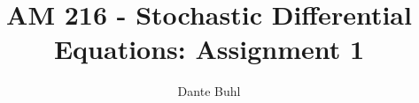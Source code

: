 \documentclass{article}
\begin{document}
\title{AM 216 - Stochastic Differential Equations: Assignment 1}
\author{Dante Buhl}


\newcommand{\wrms}{w_{\text{rms}}}
\newcommand{\bs}[1]{\boldsymbol{#1}}
\newcommand{\tb}[1]{\textbf{#1}}
\newcommand{\bmp}[1]{\begin{minipage}{#1\textwidth}}
\newcommand{\emp}{\end{minipage}}
\newcommand{\R}{\mathbb{R}}
\newcommand{\C}{\mathbb{C}}
\newcommand{\N}{\mathcal{N}}
\newcommand{\Var}{\text{Var}}
\newcommand{\Cov}{\text{Cov}}
\newcommand{\Bino}{\text{Bino}}
\newcommand{\Norm}{\mathcal{N}}
\newcommand{\erf}{\text{erf}}
\newcommand{\m}{\bs{\mu}_*}
\newcommand{\s}{\bs{\Sigma}_*}
\newcommand{\dt}{\Delta t}
\newcommand{\dx}{\Delta x}
\newcommand{\tr}[1]{\text{Tr}(#1)}
\newcommand{\Tr}[1]{\text{Tr}(#1)}
\newcommand{\Div}{\nabla \cdot}
\renewcommand{\div}{\nabla \cdot}
\newcommand{\Curl}{\nabla \times}
\newcommand{\Grad}{\nabla}
\newcommand{\grad}{\nabla}
\newcommand{\grads}{\nabla_s}
\newcommand{\gradf}{\nabla_f}
\newcommand{\xs}{x_s}
\newcommand{\x}{\bs{x}}
\newcommand{\xf}{x_f}
\newcommand{\ts}{t_s}
\newcommand{\tf}{t_f}
\newcommand{\pt}{\partial t}
\newcommand{\pz}{\partial z}
\newcommand{\uvec}{\bs{u}}
\newcommand{\bvec}{\bs{B}}
\newcommand{\nvec}{\hat{\bs{n}}}
\newcommand{\tu}{\tilde{\uvec}}
\newcommand{\B}{\bs{B}}
\newcommand{\A}{\bs{A}}
\newcommand{\jvec}{\bs{j}}
\newcommand{\F}{\bs{F}}
\newcommand{\T}{\tilde{T}}
\newcommand{\ez}{\bs{e}_z}
\newcommand{\ex}{\bs{e}_x}
\newcommand{\ey}{\bs{e}_y}
\newcommand{\eo}{\bs{e}_{\bs{\Omega}}}
\newcommand{\ppt}[1]{\frac{\partial #1}{\partial t}}
\newcommand{\pp}[2]{\frac{\partial #1}{\partial #2}}
\newcommand{\pptwo}[2]{\frac{\partial^2 #1}{\partial #2^2}}
\newcommand{\ddtwo}[2]{\frac{d^2 #1}{d #2^2}}
\newcommand{\DDt}[1]{\frac{D #1}{D t}}
\newcommand{\ppts}[1]{\frac{\partial #1}{\partial t_s}}
\newcommand{\pptf}[1]{\frac{\partial #1}{\partial t_f}}
\newcommand{\ppz}[1]{\frac{\partial #1}{\partial z}}
\newcommand{\ddz}[1]{\frac{d #1}{d z}}
\newcommand{\ppzetas}[1]{\frac{\partial^2 #1}{\partial \zeta^2}}
\newcommand{\ppzs}[1]{\frac{\partial #1}{\partial z_s}}
\newcommand{\ppzf}[1]{\frac{\partial #1}{\partial z_f}}
\newcommand{\ppx}[1]{\frac{\partial #1}{\partial x}}
\newcommand{\ddx}[1]{\frac{d #1}{d x}}
\newcommand{\ppxi}[1]{\frac{\partial #1}{\partial x_i}}
\newcommand{\ppxj}[1]{\frac{\partial #1}{\partial x_j}}
\newcommand{\ppy}[1]{\frac{\partial #1}{\partial y}}
\newcommand{\ppzeta}[1]{\frac{\partial #1}{\partial \zeta}}
\renewcommand{\k}{\bs{k}}
\newcommand{\real}[1]{\text{Re}\left[#1\right]}
\end{document}
